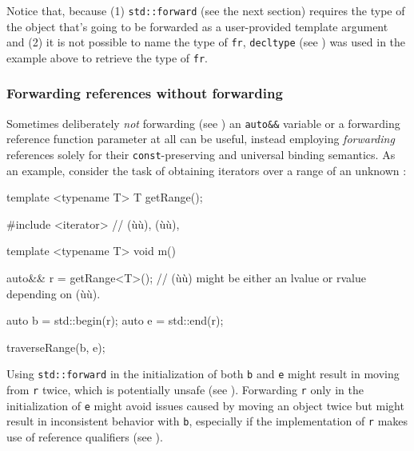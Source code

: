 \noindent Notice that, because (1) \lstinline!std::forward! (see the next section) requires the
type of the object that's going to be forwarded as a user-provided
template argument and (2) it is not possible to name the type of
\lstinline!fr!, \lstinline!decltype! (see ) 
was used in the example above
to retrieve the type of \lstinline!fr!.

\subsubsection[Forwarding references without forwarding]{Forwarding references without forwarding}\label{forwarding-references-without-forwarding}

Sometimes deliberately \emph{not} forwarding (see ) 
an \lstinline!auto&&! variable or
a forwarding reference function parameter at all can be useful, instead employing
\emph{forwarding} references solely for their \lstinline!const!-preserving
and universal binding semantics. As an example, consider the task of
obtaining iterators over a range of an unknown :

\begin{emcppshiddenlisting}[emcppsbatch=e6]
template <typename T>
T getRange();
\end{emcppshiddenlisting}
\begin{emcppslisting}[emcppsbatch=e6]
#include <iterator>  // (ù{}ù), (ù{}ù),

template <typename T>
void m()
{
    auto&& r = getRange<T>();
        // (ù{}ù) might be either an lvalue or rvalue depending on (ù{}ù).

    auto b = std::begin(r);
    auto e = std::end(r);

    traverseRange(b, e);
}
\end{emcppslisting}

\noindent Using \lstinline!std::forward! in the initialization of both \lstinline!b! and
\lstinline!e! might result in moving from \lstinline!r! twice, which is
potentially unsafe (see ). 
Forwarding
\lstinline!r! only in the initialization of \lstinline!e! might avoid issues
caused by moving an object twice but might result in inconsistent
behavior with \lstinline!b!, especially if the implementation of \lstinline!r!
makes use of reference qualifiers (see ). 

